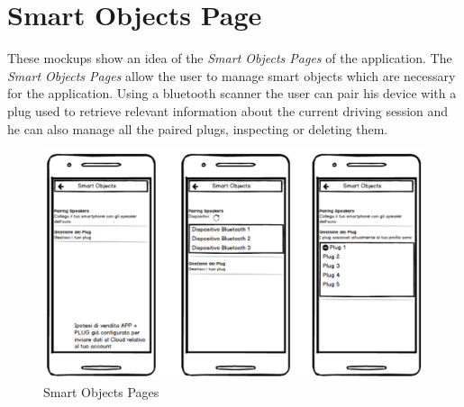 \clearpage
\section{Smart Objects Page}
These mockups show an idea of the \textit{Smart Objects Pages} of the application. The \textit{Smart Objects Pages} allow the user to manage smart objects which are necessary for the application. Using a bluetooth scanner the user can pair his device with a plug used to retrieve relevant information about the current driving session and he can also manage all the paired plugs, inspecting or deleting them.\\

\begin{figure}[htbp]
\centering
\includegraphics[width=\textwidth]{cpt/img/SmartObjectsPage.png}
\caption{Smart Objects Pages}
\end{figure}